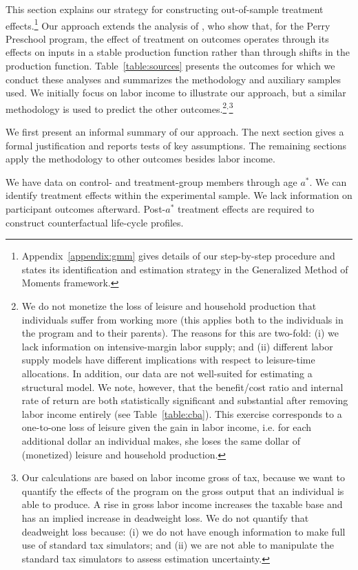 This section explains our strategy for constructing out-of-sample treatment effects.\footnote{ Appendix~\ref{appendix:gmm} gives details of our step-by-step procedure and states its identification and estimation strategy in the Generalized Method of Moments framework.} Our approach extends the analysis of \citet{Heckman_Pinto_etal_2013_PerryFactor}, who show that, for the Perry Preschool program, the effect of treatment on outcomes operates through its effects on inputs in a stable production function rather than through shifts in the production function. Table~\ref{table:sources} presents the outcomes for which we conduct these analyses and summarizes the methodology and auxiliary samples used. We initially focus on labor income to illustrate our approach, but a similar methodology is used to predict the other outcomes.\footnote{We do not monetize the loss of leisure and household production that individuals suffer from working more (this applies both to the individuals in the program and to their parents). The reasons for this are two-fold: (i) we lack information on intensive-margin labor supply; and (ii) different labor supply models have different implications with respect to leisure-time allocations. In addition, our data are not well-suited for estimating a structural model. We note, however, that the benefit/cost ratio and internal rate of return are both statistically significant and substantial after removing labor income entirely (see Table~\ref{table:cba}). This exercise corresponds to a one-to-one loss of leisure given the gain in labor income, i.e. for each additional dollar an individual makes, she loses the same dollar of (monetized) leisure and household production.}$^,$\footnote{Our calculations are based on labor income gross of tax, because we want to quantify the effects of the program on the gross output that an individual is able to produce. A rise in gross labor income increases the taxable base and has an implied increase in deadweight loss. We do not quantify that deadweight loss because: (i) we do not have enough information to make full use of standard tax simulators; and (ii) we are not able to manipulate the standard tax simulators to assess estimation uncertainty.}

We first present an informal summary of our approach. The next section gives a formal justification and reports tests of key assumptions. The remaining sections apply the methodology to other outcomes besides labor income. 

We have data on control- and treatment-group members through age $a^{\ast}$. We can identify treatment effects within the experimental sample. We lack information on participant outcomes afterward. Post-$a^{\ast}$ treatment effects are required to construct counterfactual life-cycle profiles.

